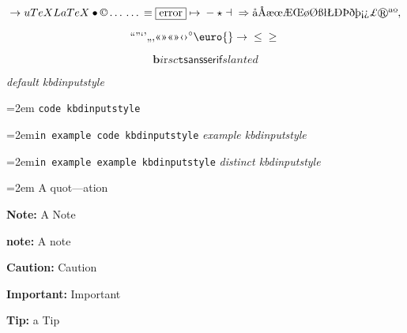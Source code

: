 \documentclass{book}
\begin{document}
\begin{titlepage}
$$
\rightarrow{}
u
TeX LaTeX \bullet{} \copyright{} \dots{} \dots{} \equiv{}
\fbox{error} \mapsto{} - \star{} \dashv{} \Rightarrow{}
\mathord{\text{\aa{}}} \mathord{\text{\AA{}}} \mathord{\text{\ae{}}} \mathord{\text{\oe{}}} \mathord{\text{\AE{}}} \mathord{\text{\OE{}}} \mathord{\text{\o{}}} \mathord{\text{\O{}}} \mathord{\text{\ss{}}} \mathord{\text{\l{}}} \mathord{\text{\L{}}} \mathord{\text{\DH{}}}
\mathord{\text{\TH{}}} \mathord{\text{\dh{}}} \mathord{\text{\th{}}} \mathord{\text{\textexclamdown{}}} \mathord{\text{\textquestiondown{}}} \mathsterling{}
\circledR{} \mathord{\text{\textordfeminine{}}} \mathord{\text{\textordmasculine{}}} , 
$$

$$
\mathord{\text{\textquotedblleft{}}} \mathord{\text{\textquotedblright{}}} 
\mathord{\text{\textquoteleft{}}} \mathord{\text{\textquoteright{}}} \mathord{\text{\quotedblbase{}}} \mathord{\text{\quotesinglbase{}}} \mathord{\text{\guillemotleft{}}}
\mathord{\text{\guillemotright{}}} \mathord{\text{\guillemotleft{}}} \mathord{\text{\guillemotright{}}} \mathord{\text{\guilsinglleft{}}}
\mathord{\text{\guilsinglright{}}} ^{\circ{}} \euro{} \rightarrow{} \leq{} \geq{}
$$

$$
\mathbf{b} \mathit{i} \mathrm{r} sc \mathtt{t} \mathsf{sansserif} slanted
$$

{\ttfamily\textsl{default kbdinputstyle}}
\par\begingroup\obeylines\obeyspaces\frenchspacing\leftskip=2em\relax\parskip=0pt\relax{}
\endgroup{}
\texttt{code kbdinputstyle}
\par\begingroup\obeylines\obeyspaces\frenchspacing\leftskip=2em\relax\parskip=0pt\relax\ttfamily{}\texttt{in example code kbdinputstyle}
\endgroup{}
{\ttfamily\textsl{example kbdinputstyle}}
\par\begingroup\obeylines\obeyspaces\frenchspacing\leftskip=2em\relax\parskip=0pt\relax\ttfamily{}\texttt{in example example kbdinputstyle}
\endgroup{}
{\ttfamily\textsl{distinct kbdinputstyle}}
\par\begingroup\obeylines\obeyspaces\frenchspacing\leftskip=2em\relax\parskip=0pt\relax{}
\endgroup{}
A quot---ation

\textbf{Note:} A Note

\textbf{note:} A note

\textbf{Caution:} Caution

\textbf{Important:} Important

\textbf{Tip:} a Tip


\end{titlepage}
\end{document}

